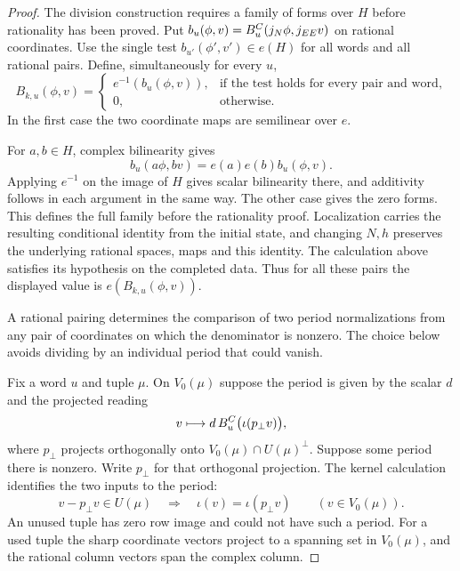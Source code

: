 \begin{proof}
The division construction requires a family of forms over \(H\)
before rationality has been proved. Put
\(b_u(\phi,v)=B_u^{C}(j_N\phi,j_{EE}v)\) on rational coordinates.
Use the single test \(b_{u'}(\phi',v')\in e(H)\) for all words and
all rational pairs. Define, simultaneously for every \(u\),
\[
 B_{k,u}(\phi,v)=
 \begin{cases}
  e^{-1}(b_u(\phi,v)),&\text{if the test holds for every pair and word},\\
  0,&\text{otherwise}.
 \end{cases}
\]
In the first case the two coordinate maps are semilinear over \(e\).

For \(a,b\in H\), complex bilinearity gives
\[
 b_u(a\phi,bv)=e(a)e(b)b_u(\phi,v).
\]
Applying \(e^{-1}\) on the image of \(H\) gives scalar bilinearity
there, and additivity follows in each argument in the same way.
The other case gives the zero forms. This defines the full family
before the rationality proof. Localization carries the
resulting conditional identity from the initial state, and
changing \(N,h\) preserves the underlying rational spaces,
maps and this identity. The calculation above satisfies its
hypothesis on the completed data. Thus for all these pairs
the displayed value is \(e(B_{k,u}(\phi,v))\).
\label{cor:automorphic-realization-67}

A rational pairing determines the comparison of two period normalizations from any pair of coordinates on which the denominator is nonzero. The choice below avoids dividing by an individual period that could vanish.

Fix a word \(u\) and tuple \(\mu\). On \(V_0(\mu)\) suppose the period is given by the scalar \(d\) and the projected reading
\[
 v\longmapsto d\,B_u^{C}\bigl(\iota(p_\perp v)\bigr),
\]
where \(p_\perp\) projects orthogonally onto \(V_0(\mu)\cap U(\mu)^\perp\). Suppose some period there is
nonzero. Write \(p_\perp\) for that orthogonal projection. The kernel calculation identifies the two inputs to the period:
\[
 v-p_\perp v\in U(\mu)\quad\Longrightarrow\quad \iota(v)=\iota(p_\perp v)\qquad(v\in V_0(\mu)).
\]
An unused tuple has zero row image and could not have such a
period. For a used tuple the sharp coordinate vectors project
to a spanning set in \(V_0(\mu)\), and the rational column
vectors span the complex column.


\end{proof}
